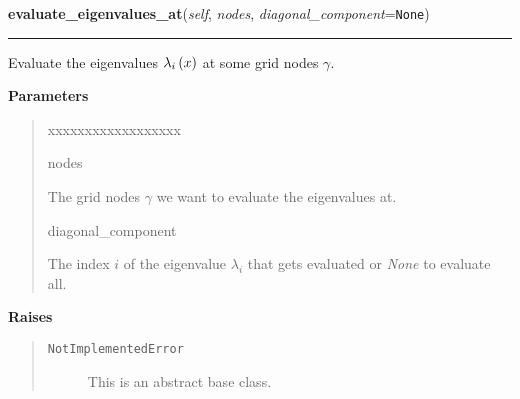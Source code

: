 \hspace{.8\funcindent}\begin{boxedminipage}{\funcwidth}

    \raggedright \textbf{evaluate\_eigenvalues\_at}(\textit{self}, \textit{nodes}, \textit{diagonal\_component}={\tt None})

    \vspace{-1.5ex}

    \rule{\textwidth}{0.5\fboxrule}
\setlength{\parskip}{2ex}
    Evaluate the eigenvalues
    $\lambda_i\left( x \right)$ at some grid
    nodes $\gamma$.

\setlength{\parskip}{1ex}
      \textbf{Parameters}
      \vspace{-1ex}

      \begin{quote}
        \begin{Ventry}{xxxxxxxxxxxxxxxxxx}

          \item[nodes]

          The grid nodes $\gamma$ we want to evaluate the
          eigenvalues at.

          \item[diagonal\_component]

          The index $i$ of the eigenvalue $\lambda_i$
          that gets evaluated or \textit{None} to evaluate all.

        \end{Ventry}

      \end{quote}

      \textbf{Raises}
    \vspace{-1ex}

      \begin{quote}
        \begin{description}

          \item[\texttt{NotImplementedError}]

          This is an abstract base class.

        \end{description}

      \end{quote}

    \end{boxedminipage}

    \label{MatrixPotential:MatrixPotential:calculate_eigenvectors}


